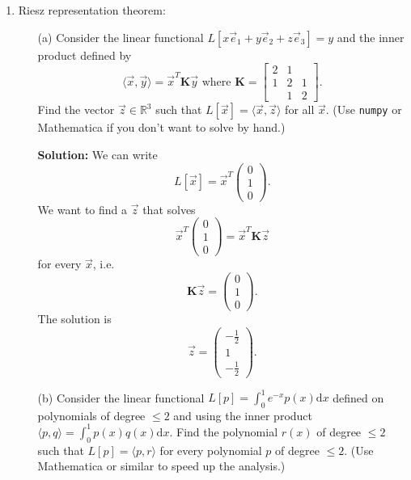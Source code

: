\documentclass[11pt,fleqn]{article}
\begin{document}
\begin{enumerate}
{\bf Solution:} Note that $\vec{x}^T\mathbf{J}\vec{x}$ is a scalar, so it is equal to its own transpose:
\[\vec{x}^T\mathbf{J}\vec{x} = \left(\vec{x}^T\mathbf{J}\vec{x}\right)^T = \vec{x}^T\mathbf{J}^T\vec{x} = -\vec{x}^T\mathbf{J}\vec{x}.\]
The only number equal to its negative is zero.

\item Riesz representation theorem:
	\begin{itemize}
	\item[(a)] Consider the linear functional $L[x\vec{e}_1+y\vec{e}_2+z\vec{e}_3] = y$ and the inner product defined by
	\[\langle\vec{x},\vec{y}\rangle = \vec{x}^T\mathbf{K}\vec{y}\text{ where }\mathbf{K} = \left[\begin{array}{ccc}2&1&\\1&2&1\\&1&2\end{array}\right].\]
	Find the vector $\vec{z}\in\mathbb{R}^3$ such that $L[\vec{x}] = \langle\vec{x},\vec{z}\rangle$ for all $\vec{x}$. (Use {\tt numpy} or Mathematica if you don't want to solve by hand.)
	
	{\bf Solution:} We can write 
	\[L[\vec{x}] = \vec{x}^T\left(\begin{array}{c}0\\1\\0\end{array}\right).\]
	We want to find a $\vec{z}$ that solves
	\[\vec{x}^T\left(\begin{array}{c}0\\1\\0\end{array}\right) = \vec{x}^T\mathbf{K}\vec{z}\]
	for every $\vec{x}$, i.e.
	\[\mathbf{K}\vec{z}= \left(\begin{array}{c}0\\1\\0\end{array}\right).\]
	The solution is
	\[\vec{z} = \left(\begin{array}{c}-\frac{1}{2}\\1\\-\frac{1}{2}\end{array}\right).\]
	
	\item[(b)] Consider the linear functional $L[p] = \int_0^1 e^{-x}p(x)\mathrm{d}x$ defined on polynomials of degree $\le 2$ and using the inner product $\langle p,q\rangle = \int_0^1p(x)q(x)\mathrm{d}x.$ Find the polynomial $r(x)$ of degree $\le 2$ such that $L[p] = \langle p,r\rangle$ for every polynomial $p$ of degree $\le 2$.  (Use Mathematica or similar to speed up the analysis.)


\end{itemize}
\end{enumerate}
\end{document}
